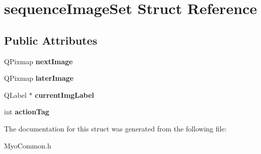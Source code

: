 \hypertarget{structsequence_image_set}{\section{sequence\+Image\+Set Struct Reference}
\label{structsequence_image_set}
}
\subsection*{Public Attributes}
\begin{DoxyCompactItemize}
\item 
\hypertarget{structsequence_image_set_abcb1e93d769c0353b752e30d2a75deaf}{Q\+Pixmap {\bfseries next\+Image}}\label{structsequence_image_set_abcb1e93d769c0353b752e30d2a75deaf}

\item 
\hypertarget{structsequence_image_set_a48e058ec9aacdd0303b29933f8f062e0}{Q\+Pixmap {\bfseries later\+Image}}\label{structsequence_image_set_a48e058ec9aacdd0303b29933f8f062e0}

\item 
\hypertarget{structsequence_image_set_a1c97e80abacb5bd9105a3afa1eb7832d}{Q\+Label $\ast$ {\bfseries current\+Img\+Label}}\label{structsequence_image_set_a1c97e80abacb5bd9105a3afa1eb7832d}

\item 
\hypertarget{structsequence_image_set_a35a9e791cf30bf489ffbe3a47d6dd32b}{int {\bfseries action\+Tag}}\label{structsequence_image_set_a35a9e791cf30bf489ffbe3a47d6dd32b}

\end{DoxyCompactItemize}


The documentation for this struct was generated from the following file\+:\begin{DoxyCompactItemize}
\item 
Myo\+Common.\+h\end{DoxyCompactItemize}
